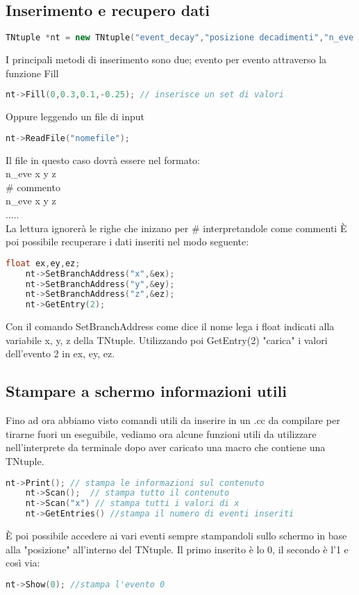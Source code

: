 \subsection{Inserimento e recupero dati}
\begin{lstlisting}[language=C++,label={cod1},mathescape=true,breaklines=true]
	TNtuple *nt = new TNtuple("event_decay","posizione decadimenti","n_eve:x:y:z"); //costruttore
\end{lstlisting}
I principali metodi di inserimento sono due; evento per evento attraverso la funzione Fill
\begin{lstlisting}[language=C++,label={cod1},mathescape=true,breaklines=true]
	nt->Fill(0,0.3,0.1,-0.25); // inserisce un set di valori
\end{lstlisting}
Oppure leggendo un file di input
\begin{lstlisting}[language=C++,label={cod1},mathescape=true,breaklines=true]
	nt->ReadFile("nomefile");
\end{lstlisting}
Il file in questo caso dovrà essere nel formato:\\
n\_eve x y z\\
\# commento\\
n\_eve x y z\\
.....\\
La lettura ignorerà le righe che inizano per \# interpretandole come commenti
È poi possibile recuperare i dati inseriti nel modo seguente:
\begin{lstlisting}[language=C++,label={cod1},mathescape=true,breaklines=true]
	float ex,ey,ez;
	nt->SetBranchAddress("x",&ex);
	nt->SetBranchAddress("y",&ey);
	nt->SetBranchAddress("z",&ez);
	nt->GetEntry(2);
\end{lstlisting}
Con il comando SetBranchAddress come dice il nome lega i float indicati alla variabile x, y, z della TNtuple. Utilizzando poi GetEntry(2) "carica" i valori dell'evento 2 in ex, ey, ez. 

\subsection{Stampare a schermo informazioni utili}
Fino ad ora abbiamo visto comandi utili da inserire in un .cc da compilare per tirarne fuori un eseguibile,  vediamo ora alcune funzioni utili da utilizzare nell'interprete da terminale dopo aver caricato una macro che contiene una TNtuple.
\begin{lstlisting}[language=C++,label={cod1},mathescape=true,breaklines=true]
	nt->Print(); // stampa le informazioni sul contenuto
	nt->Scan();  // stampa tutto il contenuto
	nt->Scan("x") // stampa tutti i valori di x
	nt->GetEntries() //stampa il numero di eventi inseriti
\end{lstlisting}
È poi possibile accedere ai vari eventi sempre stampandoli sullo schermo in base alla "posizione" all'interno del TNtuple. Il primo inserito è lo 0, il secondo è l'1 e così via:
\begin{lstlisting}[language=C++,label={cod1},mathescape=true,breaklines=true]
	nt->Show(0); //stampa l'evento 0
\end{lstlisting}

